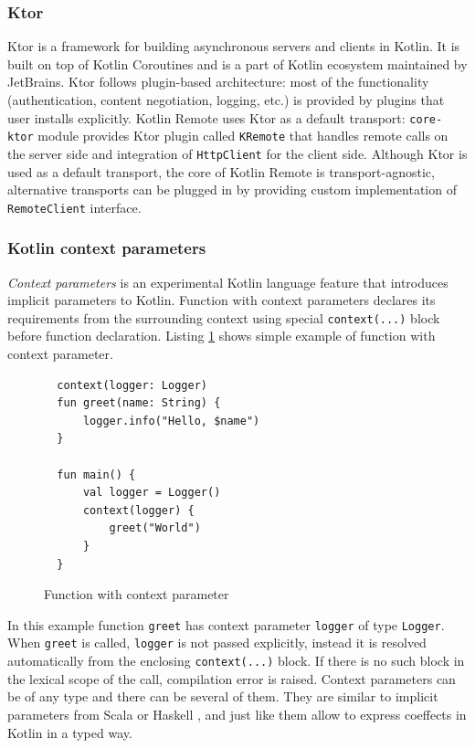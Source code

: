 \documentclass[a4paper,11pt,oneside]{article}
\newcommand{\term}[1]{\textit{#1}}
\newcommand{\kotlini}[1]{\texttt{#1}}
\begin{document}
\subsubsection{Ktor} \label{ktor-section}

Ktor \cite{noauthor_ktor_nodate} is a framework for building asynchronous servers and clients in
Kotlin. It is built on top of Kotlin Coroutines and is a part of Kotlin ecosystem maintained by
JetBrains. Ktor follows plugin-based architecture: most of the functionality (authentication,
content negotiation, logging, etc.) is provided by plugins that user installs explicitly. Kotlin
Remote uses Ktor as a default transport: \texttt{core-ktor} module provides Ktor plugin called
\kotlini{KRemote} that handles remote calls on the server side and integration of
\kotlini{HttpClient} for the client side. Although Ktor is used as a default transport, the core
of Kotlin Remote is transport-agnostic, alternative transports can be plugged in by providing
custom implementation of \kotlini{RemoteClient} interface.

\subsubsection{Kotlin context parameters} \label{kotlin-context-parameters-section}

\term{Context parameters} \cite{noauthor_keepproposalskeep-0367-context-parametersmd_nodate} is an
experimental Kotlin language feature that introduces implicit parameters to Kotlin. Function with
context parameters declares its requirements from the surrounding context using special
\kotlini{context(...)} block before function declaration. Listing
\ref{context_parameters_example} shows simple example of function with context parameter.

\begin{figure}[!h]
  \begin{verbatim}
  context(logger: Logger)
  fun greet(name: String) {
      logger.info("Hello, $name")
  }

  fun main() {
      val logger = Logger()
      context(logger) {
          greet("World")
      }
  }
  \end{verbatim}
  \caption{Function with context parameter}\label{context_parameters_example}
\end{figure}

In this example function \kotlini{greet} has context parameter \kotlini{logger} of type
\kotlini{Logger}. When \kotlini{greet} is called, \kotlini{logger} is not passed explicitly,
instead it is resolved automatically from the enclosing \kotlini{context(...)} block. If there is
no such block in the lexical scope of the call, compilation error is raised. Context parameters
can be of any type and there can be several of them. They are similar to implicit parameters from
Scala or Haskell \cite{lewis_implicit_2000}, and just like them allow to express coeffects in
Kotlin in a typed way.
\end{document}
